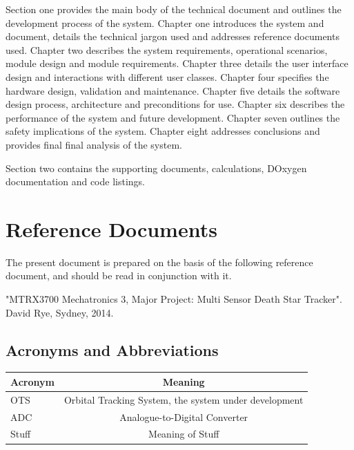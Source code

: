 \documentclass[]{report}
\begin{document}
Section one provides the main body of the technical document and outlines the development process of the system.\newline
Chapter one introduces the system and document, details the technical jargon used and addresses reference documents used. \newline
Chapter two describes the system requirements, operational scenarios, module design and module requirements. \newline
Chapter three details the user interface design and interactions with different user classes. \newline
Chapter four specifies the hardware design, validation and maintenance. \newline
Chapter five details the software design process, architecture and preconditions for use. \newline
Chapter six describes the performance of the system and future development. \newline
Chapter seven outlines the safety implications of the system. \newline
Chapter eight addresses conclusions and provides final final analysis of the system. \newline

Section two contains the supporting documents, calculations, DOxygen documentation and code listings.

\section{Reference Documents}
The present document is prepared on the basis of the following reference document, and should be read in conjunction with it.\newline 

"MTRX3700 Mechatronics 3, Major Project: Multi Sensor Death Star Tracker".  David Rye, Sydney, 2014.
\subsection{Acronyms and Abbreviations}

\begin{center}
	\begin{tabular}{| l | c |}
		\hline
		Acronym & Meaning \\ \hline \hline
		OTS & Orbital Tracking System, the system under development \\ \hline
		ADC & Analogue-to-Digital Converter \\ \hline
		Stuff & Meaning of Stuff \\
		\hline
	\end{tabular}
\end{center}
\end{document}
